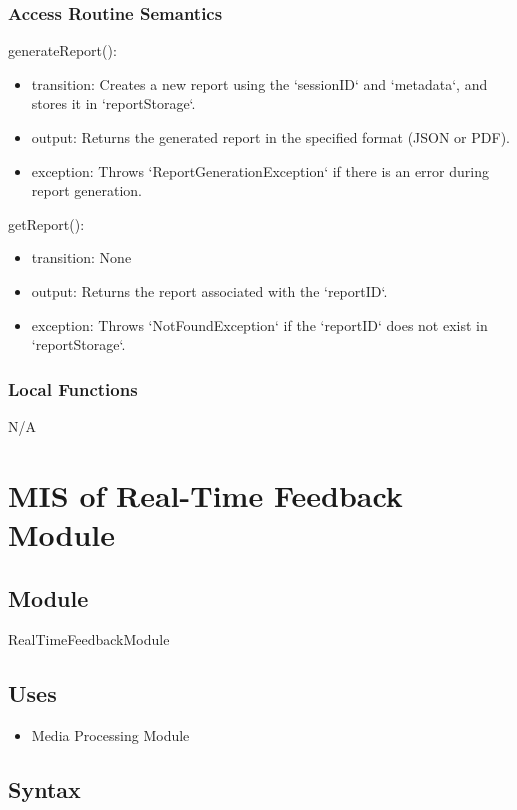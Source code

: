 \documentclass[12pt, titlepage]{article}
\begin{document}
\subsubsection{Access Routine Semantics}

\noindent generateReport():
\begin{itemize}
\item transition: Creates a new report using the `sessionID` and `metadata`, and stores it in `reportStorage`.
\item output: Returns the generated report in the specified format (JSON or PDF).
\item exception: Throws `ReportGenerationException` if there is an error during report generation.
\end{itemize}

\noindent getReport():
\begin{itemize}
\item transition: None
\item output: Returns the report associated with the `reportID`.
\item exception: Throws `NotFoundException` if the `reportID` does not exist in `reportStorage`.
\end{itemize}

\subsubsection{Local Functions}

N/A

\section{MIS of Real-Time Feedback Module} \label{RealTimeFeedbackModule}

\subsection{Module}

RealTimeFeedbackModule

\subsection{Uses}

\begin{itemize}
\item Media Processing Module
\end{itemize}

\subsection{Syntax}
\end{document}
